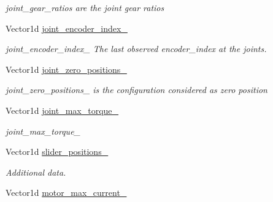 \begin{DoxyCompactItemize}
\begin{DoxyCompactList}\small\item\em joint\+\_\+gear\+\_\+ratios are the joint gear ratios \end{DoxyCompactList}\item 
Vector1d \hyperlink{classblmc__robots_1_1SingleMotor_ae993e954e97662c1381d72e015035ca6}{joint\+\_\+encoder\+\_\+index\+\_\+}\hypertarget{classblmc__robots_1_1SingleMotor_ae993e954e97662c1381d72e015035ca6}{}\label{classblmc__robots_1_1SingleMotor_ae993e954e97662c1381d72e015035ca6}

\begin{DoxyCompactList}\small\item\em joint\+\_\+encoder\+\_\+index\+\_\+ The last observed encoder\+\_\+index at the joints. \end{DoxyCompactList}\item 
Vector1d \hyperlink{classblmc__robots_1_1SingleMotor_afe177b30fe7465e605165c25f9f7e10e}{joint\+\_\+zero\+\_\+positions\+\_\+}\hypertarget{classblmc__robots_1_1SingleMotor_afe177b30fe7465e605165c25f9f7e10e}{}\label{classblmc__robots_1_1SingleMotor_afe177b30fe7465e605165c25f9f7e10e}

\begin{DoxyCompactList}\small\item\em joint\+\_\+zero\+\_\+positions\+\_\+ is the configuration considered as zero position \end{DoxyCompactList}\item 
Vector1d \hyperlink{classblmc__robots_1_1SingleMotor_a30e231807cc6d74d52b40388f1cc2209}{joint\+\_\+max\+\_\+torque\+\_\+}\hypertarget{classblmc__robots_1_1SingleMotor_a30e231807cc6d74d52b40388f1cc2209}{}\label{classblmc__robots_1_1SingleMotor_a30e231807cc6d74d52b40388f1cc2209}

\begin{DoxyCompactList}\small\item\em joint\+\_\+max\+\_\+torque\+\_\+ \end{DoxyCompactList}\item 
Vector1d \hyperlink{classblmc__robots_1_1SingleMotor_a15774ca374fff212abe4d2b397263dc9}{slider\+\_\+positions\+\_\+}
\begin{DoxyCompactList}\small\item\em Additional data. \end{DoxyCompactList}\item 
Vector1d \hyperlink{classblmc__robots_1_1SingleMotor_a581cc65baa0d38dbe0dc63ff682da4cb}{motor\+\_\+max\+\_\+current\+\_\+}\hypertarget{classblmc__robots_1_1SingleMotor_a581cc65baa0d38dbe0dc63ff682da4cb}{}\label{classblmc__robots_1_1SingleMotor_a581cc65baa0d38dbe0dc63ff682da4cb}


\end{DoxyCompactItemize}
